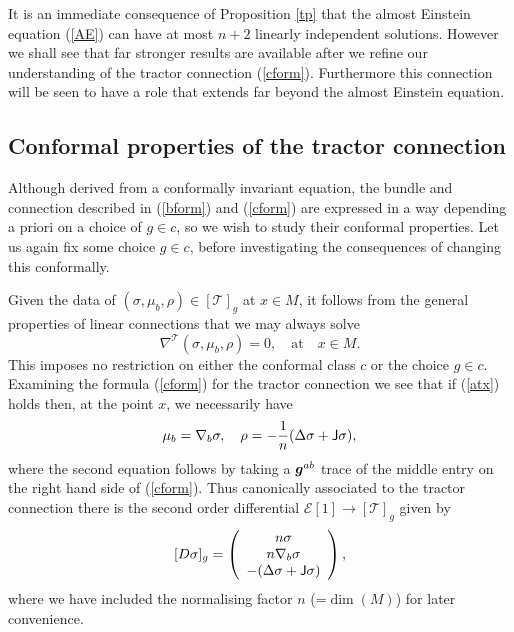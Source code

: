 \documentclass[a4paper,12pt]{amsart}
\def\Cal{\mathcal}
\newcommand{\J}{\mbox{\sf J}}
\newcommand{\ce}{{\Cal E}}
\newcommand{\cT}{{\mathcal T}}
\def\bg{\mbox{\boldmath $g$}}
\newcommand{\si}{\sigma}
\theoremstyle{remark}
\newcommand{\nn}[1]{(\ref{#1})}
\begin{document}
It is an immediate consequence of Proposition \ref{tp} that the almost Einstein equation \nn{AE} can have at most $n+2$ linearly independent solutions. However we shall see that far stronger results are available after we refine our understanding of the tractor connection \nn{cform}. Furthermore this connection will be seen to have a role that extends far beyond the almost Einstein equation.

\subsection{Conformal properties of the tractor connection} \label{conft}

Although derived from a conformally invariant equation, the bundle and
connection described in \nn{bform} and \nn{cform} are expressed in a
way depending a priori on a choice of $g\in c$, so we wish to study
their conformal properties. Let us again fix some choice $g\in c$,
before investigating the consequences of changing this conformally. 


Given the data of $(\sigma, \mu_b,\rho)\in [{\cT}]_g$ at $x\in M$, it
follows from the general properties of linear connections that we may always
solve 
\begin{equation}\label{atx}
\nabla^\cT (\sigma, \mu_b,\rho)=0, \quad \mbox{at} \quad x\in M.
\end{equation}
This imposes no
restriction on either the conformal class $c$ or the choice $g\in
c$. Examining the formula \nn{cform} for the tractor connection we see
that if \nn{atx} holds then, at the point $x$, we necessarily have
\begin{equation}\label{Dsys}
\mu_b=\nabla_b \sigma, \quad \rho =-\frac{1}{n}(\Delta \si+ \J \sigma),
\end{equation}
where the second equation follows by taking a $\bg^{ab}$ trace of
the middle entry on the right hand side of \nn{cform}. Thus canonically associated to the tractor connection there is the second order differential $ \ce[1]\to [{\cT}]_g$ given by 
\begin{equation}\label{D1form}
[D \sigma ]_g = \left(\begin{array}{c}
n \sigma \\
n \nabla_b \sigma \\
- (\Delta \si+ \J \sigma)
\end{array}\right),
\end{equation} where we have included the normalising factor 
$n$ (=$\dim (M)$) for
later convenience.
\end{document}
